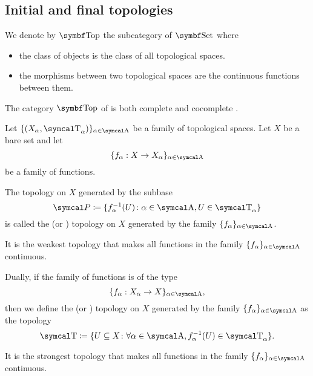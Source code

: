 \subsection{Initial and final topologies}\label{subsec:initial_final_topologies}

\begin{definition}\label{def:category_of_topological_spaces}
  We denote by \( \Cat{Top} \) the subcategory of \( \Bold{Set} \) where
  \begin{itemize}
    \item the class of objects is the class of all topological spaces.
    \item the morphisms between two topological spaces are the continuous functions between them.
  \end{itemize}
\end{definition}

\begin{theorem}\label{thm:top_complete_cocomplete}
  The category \( \Cat{Top} \) of is both complete  and cocomplete .
\end{theorem}

\begin{definition}\label{def:initial_topology}\cite{nLab:top}
  Let \( \{ (X_\al, \CT_\al) \}_{\al \in \CA} \) be a family of topological spaces. Let \( X \) be a bare set and let
  \begin{equation*}
    \{ f_\al: X \to X_\al \}_{\al \in \CA}
  \end{equation*}
  be a family of functions.

  The topology on \( X \) generated by the subbase
  \begin{equation*}
    \Cal{P} \coloneqq \{ f_\al^{-1}(U) \colon \al \in \CA, U \in \CT_\al \}
  \end{equation*}
  is called the  (or ) topology on \( X \) generated by the family \( \{ f_\al \}_{\al \in \CA} \).

  It is the weakest topology that makes all functions in the family \( \{ f_\al \}_{\al \in \CA} \) continuous.
\end{definition}

\begin{definition}\label{def:final_topology}\cite{nLab:top}
  Dually, if the family of functions is of the type
  \begin{equation*}
    \{ f_\al: X_\al \to X \}_{\al \in \CA},
  \end{equation*}
  then we define the  (or ) topology on \( X \) generated by the family \( \{ f_\al \}_{\al \in \CA} \) as the topology
  \begin{equation*}
    \CT \coloneqq \{ U \subseteq X \colon \forall \al \in \CA, f_\al^{-1}(U) \in \CT_\al \}.
  \end{equation*}

  It is the strongest topology that makes all functions in the family \( \{ f_\al \}_{\al \in \CA} \) continuous.
\end{definition}

